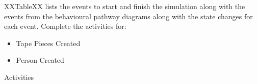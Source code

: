 \documentclass[
  10pt,
  a4paperpaper,
  DIV=11,
  numbers=noendperiod,
  oneside]{scrreprt}
\providecommand{\tightlist}{%
  \setlength{\itemsep}{0pt}\setlength{\parskip}{0pt}}\usepackage{longtable,booktabs,array}
\begin{document}
XXTableXX lists the events to start and finish the simulation along with
the events from the behavioural pathway diagrams along with the state
changes for each event. Complete the activities for:

\begin{itemize}
\tightlist
\item
  Tape Pieces Created
\item
  Person Created
\end{itemize}

\begin{longtable}{@{}>{\raggedright\arraybackslash}p{1.5cm}>{\raggedright\arraybackslash}p{2.1cm}>{\raggedright\arraybackslash}p{2.2cm}>{\raggedright\arraybackslash}p{10cm}@{}}

\caption{\label{tbl-events_pc}Activities}

\tabularnewline


\end{longtable}
\end{document}
